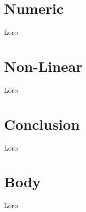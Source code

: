 \documentclass[twocolumn]{aastex631}
\begin{document}
%
%
%
%


\section{Numeric} \label{sec:numeric}
Loro

\section{Non-Linear} \label{sec:nonlinear}
Loro

\section{Conclusion} \label{sec:conclusions}
Loro

\section{Body} \label{sec:body}
Loro
\end{document}

